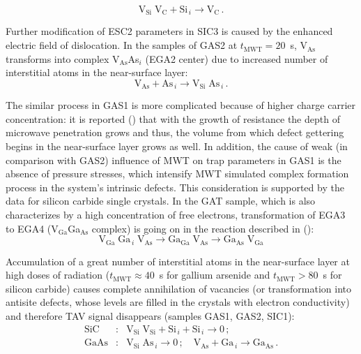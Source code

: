 \documentclass[final,3p,times,twocolumn,authoryear]{elsarticle}
\begin{document}
\begin{displaymath}
  \mathrm{V}_\mathrm{Si}\;\mathrm{V}_\mathrm{C}+\mathrm{Si}_{\,i} \rightarrow
   \mathrm{V}_\mathrm{C}\,.
\end{displaymath}

Further modification of ESC2 parameters in SIC3 is caused by the enhanced electric field of dislocation.
In the samples of GAS2 at $t_\mathrm{MWT}=20$~s,
V$_\mathrm{As}$ transforms into complex V$_\mathrm{As}$As$_i$
(EGA2 center)
due to increased number of interstitial atoms in the near-surface layer:
\begin{displaymath}
\mathrm{V}_\mathrm{As}+ \mathrm{As}_{\,i} \rightarrow \mathrm{V}_\mathrm{Si}\;\mathrm{As}_{\,i}\,.
\end{displaymath}

The similar process in GAS1 is more complicated because of higher charge carrier concentration:
it is reported (\cite{ZOHM2000}) that with the growth of resistance the depth of microwave penetration grows
and thus, the volume from which defect gettering begins in the near-surface layer grows as well.
In addition, the cause of weak (in comparison with GAS2) influence of MWT on trap parameters in GAS1 is the absence of pressure stresses,
which intensify MWT simulated complex formation process in the system’s intrinsic defects.
This consideration is supported by the data for silicon carbide single crystals.
In the GAT sample, which is also characterizes by a high concentration of free electrons,
transformation of EGA3 to EGA4 (V$_\mathrm{Ga}$Ga$_\mathrm{As}$ complex) is going on in the reaction described in (\cite{FANG1990}):
\begin{displaymath}
  \mathrm{V}_\mathrm{Ga}\;\mathrm{Ga}_{\,i}\;\mathrm{V}_\mathrm{As}\rightarrow \mathrm{Ga}_\mathrm{Ga}\;\mathrm{V}_\mathrm{As}
  \rightarrow \mathrm{Ga}_\mathrm{As}\;\mathrm{V}_\mathrm{Ga}
\end{displaymath}


Accumulation of a great number of interstitial atoms in the near-surface layer at high doses of radiation
($t_\mathrm{MWT}\approx40$~s for gallium arsenide and $t_\mathrm{MWT}>80$~s for silicon carbide)
causes complete annihilation of vacancies (or transformation into antisite defects, whose levels are filled in the crystals with electron conductivity)
 and therefore TAV signal disappears (samples GAS1, GAS2, SIC1):
\begin{eqnarray}
  \nonumber
  \mathrm{SiC}&:&\mathrm{V}_\mathrm{Si}\;\mathrm{V}_\mathrm{Si}+\mathrm{Si}_{\,i}+ \mathrm{Si}_{\,i} \rightarrow 0\,;\\
  \nonumber
  \mathrm{GaAs}&:&\mathrm{V}_\mathrm{Si}\;\mathrm{As}_{\,i} \rightarrow 0\,;\quad
  \mathrm{V}_\mathrm{As}+\mathrm{Ga}_{\,i} \rightarrow \mathrm{Ga}_\mathrm{As}\,.
\end{eqnarray}
\end{document}
